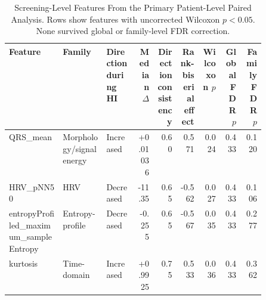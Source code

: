 \begin{table}
\caption{Screening-Level Features From the Primary Patient-Level Paired Analysis. Rows show features with uncorrected Wilcoxon $p<0.05$. None survived global or family-level FDR correction.}
\label{tab:primary_paired_screening_features}
\begin{tabular}{p{0.21\linewidth}p{0.17\linewidth}p{0.12\linewidth}rrrrrr}
\toprule
Feature & Family & Direction during HI & Median $\Delta$ & Direction consistency & Rank-biserial effect & Wilcoxon $p$ & Global FDR $p$ & Family FDR $p$ \\
\midrule
QRS_mean & Morphology/signal energy & Increased & +0.01036 & 0.60 & 0.571 & 0.024 & 0.433 & 0.120 \\
HRV_pNN50 & HRV & Decreased & -11.35 & 0.65 & -0.562 & 0.027 & 0.433 & 0.106 \\
entropyProfiled_maximum_sampleEntropy & Entropy-profile & Decreased & -0.255 & 0.65 & -0.567 & 0.035 & 0.433 & 0.277 \\
kurtosis & Time-domain & Increased & +0.9925 & 0.75 & 0.533 & 0.036 & 0.433 & 0.362 \\
\bottomrule
\end{tabular}
\end{table}
